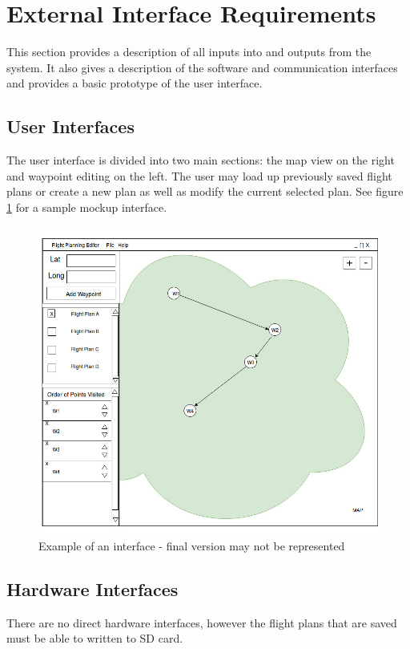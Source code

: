 \documentclass[12pt, letterpaper]{article}
\begin{document}
\section{External Interface Requirements}
  This section provides a description of all inputs into and outputs from the system.
  It also gives a description of the software and communication interfaces and provides a basic prototype of the user interface.
\subsection{User Interfaces}
  The user interface is divided into two main sections: the map view on the right and waypoint editing on the left.
  The user may load up previously saved flight plans or create a new plan as well as modify the current selected plan.
  See figure \ref{fig:ui} for a sample mockup interface.
  \begin{figure}[!ht]
    \includegraphics[scale=0.5]{images/FlightPlanning_Interface.jpg}
    \caption{Example of an interface - final version may not be represented}
    \label{fig:ui}
  \end{figure}

  \subsection{Hardware Interfaces}
    There are no direct hardware interfaces, however the flight plans that are saved must be able to written to SD card.
\end{document}
